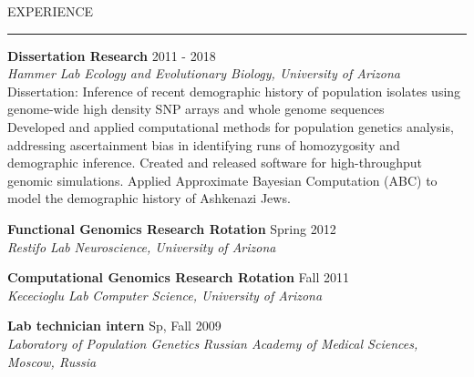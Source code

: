 \documentclass{resume} %
\renewenvironment{rSection}[1]{
\sectionskip
\textcolor{RoyalPurple}{\MakeUppercase{#1}}
\sectionlineskip
\hrule
\begin{list}{}{
\setlength{\leftmargin}{1.5em}
}
\item[]
}{
\end{list}
}
\begin{document}
\begin{rSection}{Experience}
{\bf Dissertation Research} \hfill  2011 - 2018\\ 
{\em Hammer Lab} \hfill {\em Ecology and Evolutionary Biology, University of Arizona}\\
Dissertation: Inference of recent demographic history of population isolates using genome-wide high density SNP arrays and whole genome sequences \\
Developed and applied computational methods for population genetics analysis, addressing ascertainment bias in identifying runs of homozygosity and demographic inference. Created and released software for high-throughput genomic simulations. Applied Approximate Bayesian Computation (ABC) to model the demographic history of Ashkenazi Jews.

{\bf Functional Genomics Research Rotation} \hfill  Spring 2012\\ 
{\em Restifo Lab} \hfill {\em Neuroscience, University of Arizona}

{\bf Computational Genomics Research Rotation} \hfill  Fall 2011\\ 
{\em Kececioglu Lab} \hfill {\em Computer Science, University of Arizona}

{\bf Lab technician intern} \hfill  Sp, Fall 2009\\ 
{\em Laboratory of Population Genetics} \hfill {\em Russian Academy of Medical Sciences, Moscow, Russia}

\end{rSection}


\end{document}
